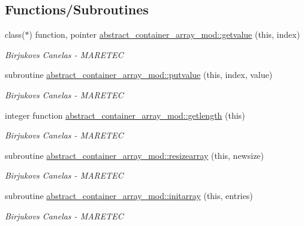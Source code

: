 \subsection*{Functions/\+Subroutines}
\begin{DoxyCompactItemize}
\item 
class($\ast$) function, pointer \hyperlink{namespaceabstract__container__array__mod_a2b3e0aec504d76c73bf7f18158924af4}{abstract\+\_\+container\+\_\+array\+\_\+mod\+::getvalue} (this, index)
\begin{DoxyCompactList}\small\item\em Birjukovs Canelas -\/ M\+A\+R\+E\+T\+EC \end{DoxyCompactList}\item 
subroutine \hyperlink{namespaceabstract__container__array__mod_aae1f6309c51e282a528ce78f128443e0}{abstract\+\_\+container\+\_\+array\+\_\+mod\+::putvalue} (this, index, value)
\begin{DoxyCompactList}\small\item\em Birjukovs Canelas -\/ M\+A\+R\+E\+T\+EC \end{DoxyCompactList}\item 
integer function \hyperlink{namespaceabstract__container__array__mod_a22d71ca3f03bf0bb5d3737338e5e349a}{abstract\+\_\+container\+\_\+array\+\_\+mod\+::getlength} (this)
\begin{DoxyCompactList}\small\item\em Birjukovs Canelas -\/ M\+A\+R\+E\+T\+EC \end{DoxyCompactList}\item 
subroutine \hyperlink{namespaceabstract__container__array__mod_ac2d73eb111ffde938f81e3f93b0cb3e0}{abstract\+\_\+container\+\_\+array\+\_\+mod\+::resizearray} (this, newsize)
\begin{DoxyCompactList}\small\item\em Birjukovs Canelas -\/ M\+A\+R\+E\+T\+EC \end{DoxyCompactList}\item 
subroutine \hyperlink{namespaceabstract__container__array__mod_a07b39c73368acf72d95a1dbef0f25943}{abstract\+\_\+container\+\_\+array\+\_\+mod\+::initarray} (this, entries)
\begin{DoxyCompactList}\small\item\em Birjukovs Canelas -\/ M\+A\+R\+E\+T\+EC \end{DoxyCompactList}\end{DoxyCompactItemize}
